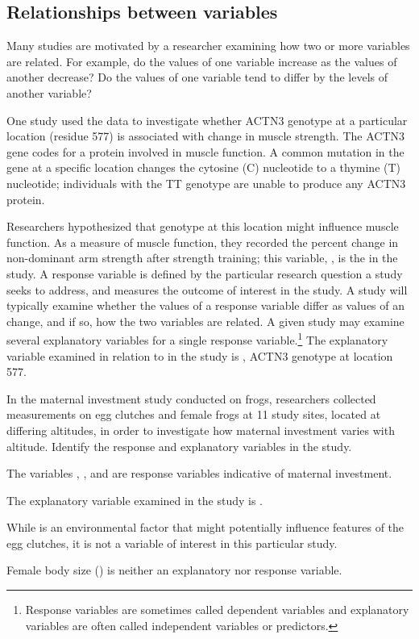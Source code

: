 \subsection{Relationships between variables}
\label{variableRelations}

Many studies are motivated by a researcher examining how two or more variables are related. For example, do the values of one variable increase as the values of another decrease? Do the values of one variable tend to differ by the levels of another variable?

One study used the  data to investigate whether ACTN3 genotype at a particular location (residue 577) is associated with change in muscle strength. The ACTN3 gene codes for a protein involved in muscle function. A common mutation in the gene at a specific location changes the cytosine (C) nucleotide to a thymine (T) nucleotide; individuals with the TT genotype are unable to produce any ACTN3 protein. 

Researchers hypothesized that genotype at this location might influence muscle function. As a measure of muscle function, they recorded the percent change in non-dominant arm strength after strength training; this variable, , is the  in the study. A response variable is defined by the particular research question a study seeks to address, and measures the outcome of interest in the study. A study will typically examine whether the values of a response variable differ as values of an  change, and if so, how the two variables are related. A given study may examine several explanatory variables for a single response variable.\footnote{Response variables are sometimes called dependent variables and explanatory variables are often called independent variables or predictors.} The explanatory variable examined in relation to  in the study is , ACTN3 genotype at location 577. 

\begin{example}{In the maternal investment study conducted on frogs, researchers collected measurements on egg clutches and female frogs at 11 study sites, located at differing altitudes, in order to investigate how maternal investment varies with altitude. Identify the response and explanatory variables in the study.}

The variables , , and  are response variables indicative of maternal investment.
	
The explanatory variable examined in the study is . 

While  is an environmental factor that might potentially influence features of the egg clutches, it is not a variable of interest in this particular study.

Female body size () is neither an explanatory nor response variable.

\label{frogVarTypesEx}

\end{example}	

